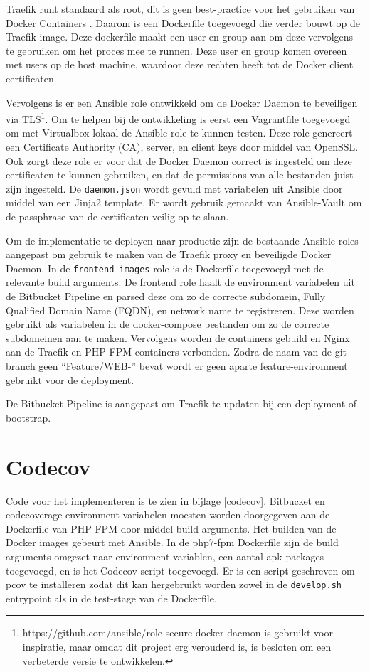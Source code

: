 Traefik runt standaard als root, dit is geen best-practice voor het gebruiken van Docker Containers \parencite{DockerBestPractices}. Daarom is een Dockerfile toegevoegd die verder bouwt op de Traefik image. Deze dockerfile maakt een user en group aan om deze vervolgens te gebruiken om het proces mee te runnen. Deze user en group komen overeen met users op de host machine, waardoor deze rechten heeft tot de Docker client certificaten.

Vervolgens is er een Ansible role ontwikkeld om de Docker Daemon te beveiligen via TLS\footnote{https://github.com/ansible/role-secure-docker-daemon is gebruikt voor inspiratie, maar omdat dit project erg verouderd is, is besloten om een verbeterde versie te ontwikkelen.}. Om te helpen bij de ontwikkeling is eerst een Vagrantfile toegevoegd om met Virtualbox lokaal de Ansible role te kunnen testen. Deze role genereert een Certificate Authority (CA), server, en client keys door middel van OpenSSL. Ook zorgt deze role er voor dat de Docker Daemon correct is ingesteld om deze certificaten te kunnen gebruiken, en dat de permissions van alle bestanden juist zijn ingesteld. De \texttt{daemon.json} wordt gevuld met variabelen uit Ansible door middel van een Jinja2 template. Er wordt gebruik gemaakt van Ansible-Vault om de passphrase van de certificaten veilig op te slaan.

Om de implementatie te deployen naar productie zijn de bestaande Ansible roles aangepast om gebruik te maken van de Traefik proxy en beveiligde Docker Daemon. In de \texttt{frontend-images} role is de Dockerfile toegevoegd met de relevante build arguments. De frontend role haalt de environment variabelen uit de Bitbucket Pipeline en parsed deze om zo de correcte subdomein, Fully Qualified Domain Name (FQDN), en network name te registreren. Deze worden gebruikt als variabelen in de docker-compose bestanden om zo de correcte subdomeinen aan te maken. Vervolgens worden de containers gebuild en Nginx aan de Traefik en PHP-FPM containers verbonden. Zodra de naam van de git branch geen \enquote{Feature/WEB-} bevat wordt er geen aparte feature-environment gebruikt voor de deployment.

De Bitbucket Pipeline is aangepast om Traefik te updaten bij een deployment of bootstrap.

\section{Codecov}
Code voor het implementeren is te zien in bijlage \ref{codecov}. Bitbucket en codecoverage environment variabelen moesten worden doorgegeven aan de Dockerfile van PHP-FPM door middel build arguments. Het builden van de Docker images gebeurt met Ansible. In de php7-fpm Dockerfile zijn de build arguments omgezet naar environment variablen, een aantal apk packages toegevoegd, en is het Codecov script toegevoegd. Er is een script geschreven om pcov te installeren zodat dit kan hergebruikt worden zowel in de \texttt{develop.sh} entrypoint als in de test-stage van de Dockerfile.

